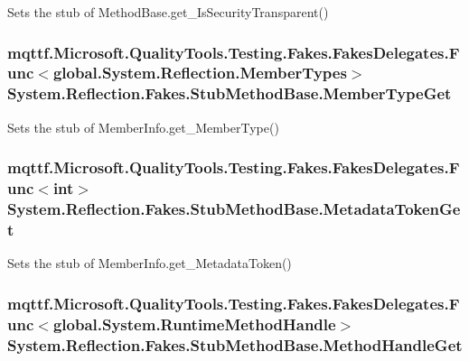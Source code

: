 Sets the stub of Method\-Base.\-get\-\_\-\-Is\-Security\-Transparent()

\hypertarget{class_system_1_1_reflection_1_1_fakes_1_1_stub_method_base_aa0e3dfdce222e3b5cc267cc07abcf459}{
\subsubsection[{Member\-Type\-Get}]{\setlength{\rightskip}{0pt plus 5cm}mqttf.\-Microsoft.\-Quality\-Tools.\-Testing.\-Fakes.\-Fakes\-Delegates.\-Func$<$global.\-System.\-Reflection.\-Member\-Types$>$ System.\-Reflection.\-Fakes.\-Stub\-Method\-Base.\-Member\-Type\-Get}}\label{class_system_1_1_reflection_1_1_fakes_1_1_stub_method_base_aa0e3dfdce222e3b5cc267cc07abcf459}


Sets the stub of Member\-Info.\-get\-\_\-\-Member\-Type()

\hypertarget{class_system_1_1_reflection_1_1_fakes_1_1_stub_method_base_a7dabc70305445b12b812375decf0eba0}{
\subsubsection[{Metadata\-Token\-Get}]{\setlength{\rightskip}{0pt plus 5cm}mqttf.\-Microsoft.\-Quality\-Tools.\-Testing.\-Fakes.\-Fakes\-Delegates.\-Func$<$int$>$ System.\-Reflection.\-Fakes.\-Stub\-Method\-Base.\-Metadata\-Token\-Get}}\label{class_system_1_1_reflection_1_1_fakes_1_1_stub_method_base_a7dabc70305445b12b812375decf0eba0}


Sets the stub of Member\-Info.\-get\-\_\-\-Metadata\-Token()

\hypertarget{class_system_1_1_reflection_1_1_fakes_1_1_stub_method_base_ad93d0100b5faf9e608c6f8733e4d5b08}{
\subsubsection[{Method\-Handle\-Get}]{\setlength{\rightskip}{0pt plus 5cm}mqttf.\-Microsoft.\-Quality\-Tools.\-Testing.\-Fakes.\-Fakes\-Delegates.\-Func$<$global.\-System.\-Runtime\-Method\-Handle$>$ System.\-Reflection.\-Fakes.\-Stub\-Method\-Base.\-Method\-Handle\-Get}}\label{class_system_1_1_reflection_1_1_fakes_1_1_stub_method_base_ad93d0100b5faf9e608c6f8733e4d5b08}


